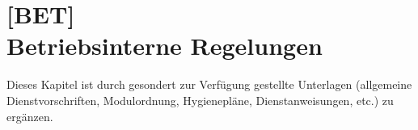 \chapter[{[BET]} Betriebsinterne Regelungen]{[BET]\\Betriebsinterne Regelungen}
\label{chp:BET}

Dieses Kapitel ist durch gesondert zur Verfügung gestellte Unterlagen
(allgemeine Dienstvorschriften, Modulordnung, Hygienepläne,
Dienstanweisungen, etc.) zu ergänzen.
